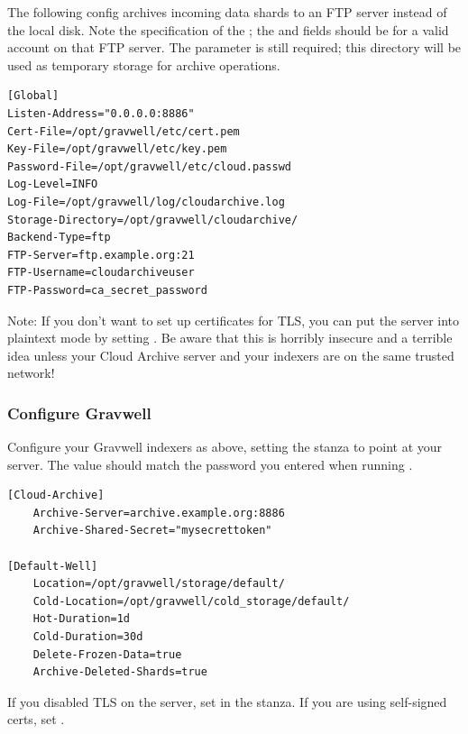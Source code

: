 {{The following config archives incoming data shards to an FTP server instead of the local disk. Note the specification of the ; the  and  fields should be for a valid account on that FTP server. The  parameter is still required; this directory will be used as temporary storage for archive operations.

\begin{verbatim}
[Global]
Listen-Address="0.0.0.0:8886"
Cert-File=/opt/gravwell/etc/cert.pem
Key-File=/opt/gravwell/etc/key.pem
Password-File=/opt/gravwell/etc/cloud.passwd
Log-Level=INFO
Log-File=/opt/gravwell/log/cloudarchive.log
Storage-Directory=/opt/gravwell/cloudarchive/
Backend-Type=ftp
FTP-Server=ftp.example.org:21
FTP-Username=cloudarchiveuser
FTP-Password=ca_secret_password
\end{verbatim}

Note: If you don't want to set up certificates for TLS, you can put the server into plaintext mode by setting . Be aware that this is horribly insecure and a terrible idea unless your Cloud Archive server and your indexers are on the same trusted network!

\subsubsection{Configure Gravwell}

Configure your Gravwell indexers as above, setting the  stanza to point at your server. The  value should match the password you entered when running .

\begin{verbatim}
[Cloud-Archive]
	Archive-Server=archive.example.org:8886
	Archive-Shared-Secret="mysecrettoken"

[Default-Well]
	Location=/opt/gravwell/storage/default/
	Cold-Location=/opt/gravwell/cold_storage/default/
	Hot-Duration=1d
	Cold-Duration=30d
	Delete-Frozen-Data=true
	Archive-Deleted-Shards=true
\end{verbatim}

If you disabled TLS on the server, set  in the  stanza. If you are using self-signed certs, set .

\clearpage
}}
